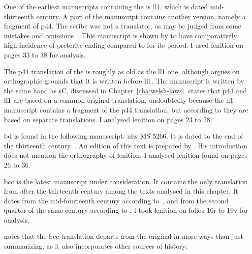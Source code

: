 One of the earliest manuscripts containing the  is \gls{ll1}, which
is dated mid-thirteenth century.  A part of
the manuscript contains another version, namely a fragment
of \gls{p44}. The scribe was not a translator, as may be judged from
some mistakes and omissions~\autocite[xxxvii]{roberts_brut_1971}. This manuscript is shown by \textcite[80--81]{Rod_Datable98} to have comparatively high incidence of preterite ending  compared to  for its period. 
I used lenition on pages 33 to 38 for analysis.



The \gls{p44} translation of the  is roughly as old as the \gls{ll1} one, although \textcite[85]{Rus_Orthography93} argues on orthographic grounds that it is written before \gls{ll1}. The manuscript is written by the same hand as \gls{sC}, discussed in Chapter~\ref{cha:welsh-laws}.
\Textcite[xix]{Lew_Brut42} states that \gls{p44} and \gls{ll1} are based on a common original translation, undoubtedly because the \gls{ll1} manuscript contains a fragment of the \gls{p44} translation, but according to \textcite[xliii--xliv]{Rob_Astudiaeth69}  they are based on separate translations.
I analysed lenition on pages 23 to 28.

\Gls{bd} is found in the following manuscript: \gls{nlw} MS 5266.
It is dated to the end of the thirteenth century~\autocite[xliii]{Rob_Astudiaeth69}.
An edition of this text is prepared by \textcite{Lew_Brut42}.
His introduction does not mention the orthography of lenition.
I analysed lenition found on pages 26 to 36.




\Gls{bcc} is the latest manuscript under consideration.
It contains the only translation from after the thirteenth century among the texts analysed in this chapter.
It dates from the mid-fourteenth century according to~\textcite[xlv]{Rob_Astudiaeth69}, and from the second quarter of the same century according to \textcite[xviii]{Jon_Brenhinedd71}.
I took lenition on folios 16r to 19v for analysis.

\Textcite{Rob_Testunau74} notes that the \gls{bcc} translation departs from the original in more ways than just summarizing, as it also incorporates other sources of history:


